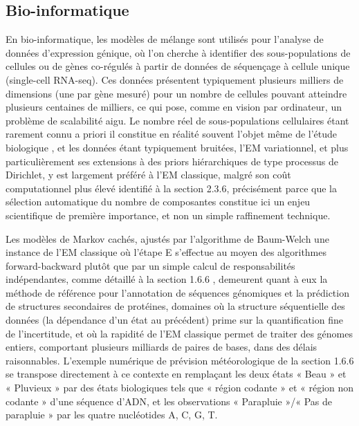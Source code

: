 \subsection{Bio-informatique}
En bio-informatique, les modèles de mélange sont utilisés pour l'analyse de données d'expression génique, où l'on cherche à identifier des sous-populations de cellules ou de gènes co-régulés à partir de données de séquençage à cellule unique (single-cell RNA-seq). Ces données présentent typiquement plusieurs milliers de dimensions (une par gène mesuré) pour un nombre de cellules pouvant atteindre plusieurs centaines de milliers, ce qui pose, comme en vision par ordinateur, un problème de scalabilité aigu. Le nombre réel de sous-populations cellulaires étant rarement connu a priori  il constitue en réalité souvent l'objet même de l'étude biologique , et les données étant typiquement bruitées, l'EM variationnel, et plus particulièrement ses extensions à des priors hiérarchiques de type processus de Dirichlet, y est largement préféré à l'EM classique, malgré son coût computationnel plus élevé identifié à la section 2.3.6, précisément parce que la sélection automatique du nombre de composantes constitue ici un enjeu scientifique de première importance, et non un simple raffinement technique.

Les modèles de Markov cachés, ajustés par l'algorithme de Baum-Welch  une instance de l'EM classique où l'étape E s'effectue au moyen des algorithmes forward-backward plutôt que par un simple calcul de responsabilités indépendantes, comme détaillé à la section 1.6.6 , demeurent quant à eux la méthode de référence pour l'annotation de séquences génomiques et la prédiction de structures secondaires de protéines, domaines où la structure séquentielle des données (la dépendance d'un état au précédent) prime sur la quantification fine de l'incertitude, et où la rapidité de l'EM classique permet de traiter des génomes entiers, comportant plusieurs milliards de paires de bases, dans des délais raisonnables. L'exemple numérique de prévision météorologique de la section 1.6.6 se transpose directement à ce contexte en remplaçant les deux états « Beau » et « Pluvieux » par des états biologiques tels que « région codante » et « région non codante » d'une séquence d'ADN, et les observations « Parapluie »/« Pas de parapluie » par les quatre nucléotides A, C, G, T.

